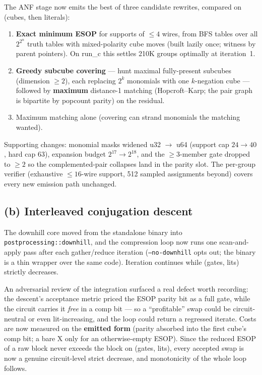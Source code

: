 \documentclass[11pt]{article}
\newcommand{\code}[1]{\texttt{#1}}
\begin{document}
The ANF stage now emits the best of three candidate rewrites, compared on (cubes, then literals):

\begin{enumerate}
\item \textbf{Exact minimum ESOP} for supports of $\le 4$ wires, from BFS tables over all $2^{2^n}$ truth tables with mixed-polarity cube moves (built lazily once; witness by parent pointers). On run\_c this settles 210K groups optimally at iteration~1.
\item \textbf{Greedy subcube covering} --- hunt maximal fully-present subcubes (dimension $\ge 2$), each replacing $2^k$ monomials with one $k$-negation cube --- followed by \textbf{maximum} distance-1 matching (Hopcroft--Karp; the pair graph is bipartite by popcount parity) on the residual.
\item Maximum matching alone (covering can strand monomials the matching wanted).
\end{enumerate}

Supporting changes: monomial masks widened u32 $\to$ u64 (support cap $24 \to 40$, hard cap 63), expansion budget $2^{17} \to 2^{18}$, and the $\ge 3$-member gate dropped to $\ge 2$ so the complemented-pair collapses land in the parity slot. The per-group verifier (exhaustive $\le 16$-wire support, 512 sampled assignments beyond) covers every new emission path unchanged.

\subsection*{(b) Interleaved conjugation descent}

The downhill core moved from the standalone binary into \code{postprocessing::downhill}, and the compression loop now runs one scan-and-apply pass after each gather/reduce iteration (\code{--no-downhill} opts out; the binary is a thin wrapper over the same code). Iteration continues while (gates, lits) strictly decreases.

An adversarial review of the integration surfaced a real defect worth recording: the descent's acceptance metric priced the ESOP parity bit as a full gate, while the circuit carries it \emph{free} in a comp bit --- so a ``profitable'' swap could be circuit-neutral or even lit-increasing, and the loop could return a regressed iterate. Costs are now measured on the \textbf{emitted form} (parity absorbed into the first cube's comp bit; a bare X only for an otherwise-empty ESOP). Since the reduced ESOP of a raw block never exceeds the block on (gates, lits), every accepted swap is now a genuine circuit-level strict decrease, and monotonicity of the whole loop follows.
\end{document}
